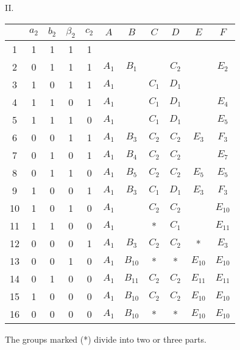 \documentclass[oneside]{article}
\begin{document}
\begin{center}
\large II. \normalsize

\smallskip
\begin{tabular}{|c|c|c|c|c|c|c|c|c|c|c|}
\hline
  &$a_2$&$b_2$&$\beta_2$&$c_2$& $A$ &  $B$   & $C$ & $D$ &   $E$  &   $F$   \\ \hline
 1&  1  &  1  &    1    &  1  &     &        &     &     &        &         \\ \hline
 2&  0  &  1  &    1    &  1  &$A_1$& $B_1$  &     &$C_2$&        & $E_2$   \\ \hline
 3&  1  &  0  &    1    &  1  &$A_1$&        &$C_1$&$D_1$&        &         \\ \hline
 4&  1  &  1  &    0    &  1  &$A_1$&        &$C_1$&$D_1$&        & $E_4$   \\ \hline
 5&  1  &  1  &    1    &  0  &$A_1$&        &$C_1$&$D_1$&        & $E_5$   \\ \hline
 6&  0  &  0  &    1    &  1  &$A_1$& $B_3$  &$C_2$&$C_2$&  $E_3$ & $F_3$   \\ \hline
 7&  0  &  1  &    0    &  1  &$A_1$& $B_4$  &$C_2$&$C_2$&        & $E_7$   \\ \hline
 8&  0  &  1  &    1    &  0  &$A_1$& $B_5$  &$C_2$&$C_2$&  $E_5$ & $E_5$   \\ \hline
 9&  1  &  0  &    0    &  1  &$A_1$& $B_3$  &$C_1$&$D_1$&  $E_3$ & $F_3$   \\ \hline
10&  1  &  0  &    1    &  0  &$A_1$&        &$C_2$&$C_2$&        &$E_{10}$ \\ \hline
11&  1  &  1  &    0    &  0  &$A_1$&        &  *  &$C_1$&        &$E_{11}$ \\ \hline
12&  0  &  0  &    0    &  1  &$A_1$& $B_3$  &$C_2$&$C_2$&    *   & $E_3$   \\ \hline
13&  0  &  0  &    1    &  0  &$A_1$&$B_{10}$&  *  &  *  &$E_{10}$&$E_{10}$ \\ \hline
14&  0  &  1  &    0    &  0  &$A_1$&$B_{11}$&$C_2$&$C_2$&$E_{11}$&$E_{11}$ \\ \hline
15&  1  &  0  &    0    &  0  &$A_1$&$B_{10}$&$C_2$&$C_2$&$E_{10}$&$E_{10}$ \\ \hline
16&  0  &  0  &    0    &  0  &$A_1$&$B_{10}$&  *  &  *  &$E_{10}$&$E_{10}$ \\ \hline
\end{tabular}

\footnotesize The groups marked (*) divide into two or three parts. \normalsize
\end{center}
\end{document}
